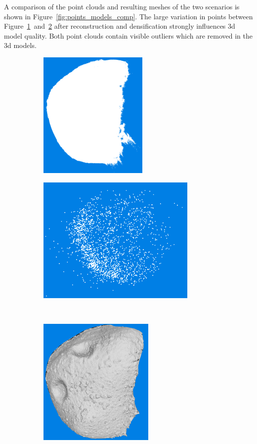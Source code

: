 A comparison of the point clouds and resulting meshes of the two scenarios is shown in Figure~\ref{fig:points_models_comp}. The large variation in points between Figure~\ref{fig:points_50_10}~and~\ref{fig:points_400_1} after reconstruction and densification strongly influences \gls{3d} model quality. Both point clouds contain visible outliers which are removed in the \gls{3d} models.
\begin{figure}[htb]
    \centering
        \begin{subfigure}[b]{0.42\textwidth}
            \centering
            \includegraphics[width=\textwidth,height=6.2cm]{doc/thesis/0_figures/models_quality/50_10/120_50_10_dense2.png}
            \caption{}
            \label{fig:points_50_10}
        \end{subfigure}
        \begin{subfigure}[b]{0.42\textwidth}
            \centering
            \includegraphics[width=\textwidth,height=6.2cm]{doc/thesis/0_figures/models_quality/400_1/120_400_1_points2.png}
            \caption{}
            \label{fig:points_400_1}
        \end{subfigure}
        \\
        \begin{subfigure}[b]{0.42\textwidth}
            \centering
            \includegraphics[width=\textwidth,height=6.2cm]{doc/thesis/0_figures/models_quality/50_10/120_50_10_refine2.png}

\end{subfigure}
\end{figure}
